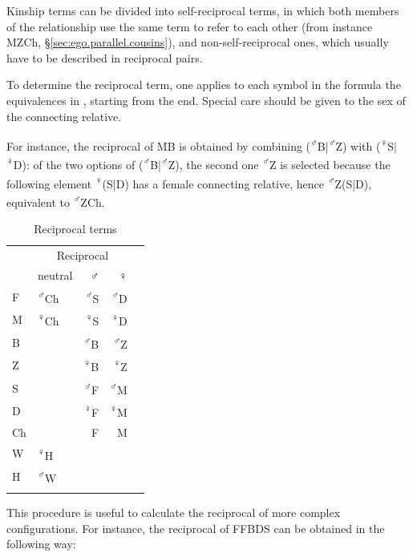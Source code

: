 Kinship terms can be divided into self-reciprocal terms, in which both members of the relationship use the same term to refer to each other (from instance  MZCh, §\ref{sec:ego.parallel.cousins}), and non-self-reciprocal ones, which usually have to be described in reciprocal pairs. 

To determine the reciprocal term, one applies to each symbol in the formula the equivalences in , starting from the end. Special care should be given to the sex of the connecting relative. 

For instance, the reciprocal of MB is obtained by combining (\textsuperscript{♂}B|\textsuperscript{♂}Z) with (\textsuperscript{♀}S|\textsuperscript{♀}D): of the two options of (\textsuperscript{♂}B|\textsuperscript{♂}Z), the second one \textsuperscript{♂}Z is selected because the following element \textsuperscript{♀}(S|D) has a female connecting relative, hence \textsuperscript{♂}Z(S|D), equivalent to  \textsuperscript{♂}ZCh.

 

\begin{table}
\caption{Reciprocal terms} \label{tab:kinship.reciprocal}
\begin{tabular}{Xlrrr}
\lsptoprule
& \multicolumn{3}{c}{Reciprocal} \\
   & neutral &♂   & ♀  \\
 \midrule
F &\textsuperscript{♂}Ch &\textsuperscript{♂}S & \textsuperscript{♂}D \\
M &\textsuperscript{♀}Ch & \textsuperscript{♀}S & \textsuperscript{♀}D \\
 \tablevspace
B & &\textsuperscript{♂}B & \textsuperscript{♂}Z \\
Z & &\textsuperscript{♀}B & \textsuperscript{♀}Z   \\
 \tablevspace
S & &\textsuperscript{♂}F & \textsuperscript{♂}M \\
D & &\textsuperscript{♀}F & \textsuperscript{♀}M   \\
Ch &&F &  M   \\
 \tablevspace
W &   \textsuperscript{♀}H   \\
H &    \textsuperscript{♂}W    \\
\lspbottomrule
\end{tabular}
\end{table}

This procedure is useful to calculate the reciprocal of more complex configurations. For instance, the reciprocal of FFBDS can be obtained in the following way:


